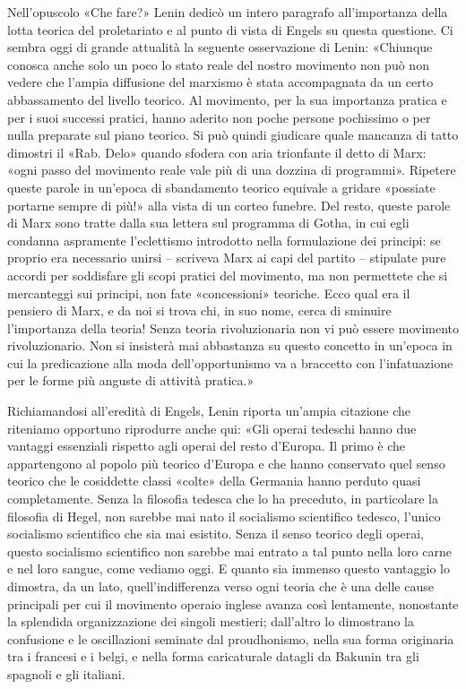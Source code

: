 \documentclass[12pt,a4paper,openany]{book}
\begin{document}
Nell'opuscolo «Che fare?» Lenin dedicò un intero paragrafo all'importanza della lotta teorica del proletariato e al punto di vista di Engels su questa questione. Ci sembra oggi di grande attualità la seguente osservazione di Lenin: «Chiunque conosca anche solo un poco lo stato reale del nostro movimento non può non vedere che l'ampia diffusione del marxismo è stata accompagnata da un certo abbassamento del livello teorico. Al movimento, per la sua importanza pratica e per i suoi successi pratici, hanno aderito non poche persone pochissimo o per nulla preparate sul piano teorico. Si può quindi giudicare quale mancanza di tatto dimostri il «Rab. Delo» quando sfodera con aria trionfante il detto di Marx: «ogni passo del movimento reale vale più di una dozzina di programmi». Ripetere queste parole in un'epoca di sbandamento teorico equivale a gridare «possiate portarne sempre di più!» alla vista di un corteo funebre. Del resto, queste parole di Marx sono tratte dalla sua lettera sul programma di Gotha, in cui egli condanna aspramente l'eclettismo introdotto nella formulazione dei principi: se proprio era necessario unirsi – scriveva Marx ai capi del partito – stipulate pure accordi per soddisfare gli scopi pratici del movimento, ma non permettete che si mercanteggi sui principi, non fate «concessioni» teoriche. Ecco qual era il pensiero di Marx, e da noi si trova chi, in suo nome, cerca di sminuire l'importanza della teoria! Senza teoria rivoluzionaria non vi può essere movimento rivoluzionario. Non si insisterà mai abbastanza su questo concetto in un'epoca in cui la predicazione alla moda dell'opportunismo va a braccetto con l'infatuazione per le forme più anguste di attività pratica.»

Richiamandosi all'eredità di Engels, Lenin riporta un'ampia citazione che riteniamo opportuno riprodurre anche qui: «Gli operai tedeschi hanno due vantaggi essenziali rispetto agli operai del resto d'Europa. Il primo è che appartengono al popolo più teorico d'Europa e che hanno conservato quel senso teorico che le cosiddette classi «colte» della Germania hanno perduto quasi completamente. Senza la filosofia tedesca che lo ha preceduto, in particolare la filosofia di Hegel, non sarebbe mai nato il socialismo scientifico tedesco, l'unico socialismo scientifico che sia mai esistito. Senza il senso teorico degli operai, questo socialismo scientifico non sarebbe mai entrato a tal punto nella loro carne e nel loro sangue, come vediamo oggi. E quanto sia immenso questo vantaggio lo dimostra, da un lato, quell'indifferenza verso ogni teoria che è una delle cause principali per cui il movimento operaio inglese avanza così lentamente, nonostante la splendida organizzazione dei singoli mestieri; dall'altro lo dimostrano la confusione e le oscillazioni seminate dal proudhonismo, nella sua forma originaria tra i francesi e i belgi, e nella forma caricaturale datagli da Bakunin tra gli spagnoli e gli italiani.
\end{document}
